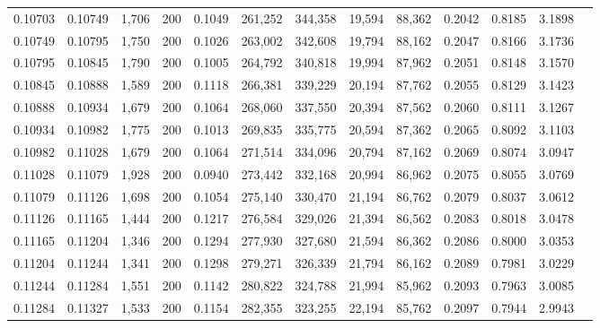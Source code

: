 \begin{tabular}{rrrrrrrrrrrrr}
0.10703 & 0.10749 & 1,706 & 200 &                                     0.1049 & 261,252 & 344,358 &  19,594 &  88,362 & 0.2042 & 0.8185 & 3.1898 \\
0.10749 & 0.10795 & 1,750 & 200 &                                     0.1026 & 263,002 & 342,608 &  19,794 &  88,162 & 0.2047 & 0.8166 & 3.1736 \\
0.10795 & 0.10845 & 1,790 & 200 &                                     0.1005 & 264,792 & 340,818 &  19,994 &  87,962 & 0.2051 & 0.8148 & 3.1570 \\
0.10845 & 0.10888 & 1,589 & 200 &                                     0.1118 & 266,381 & 339,229 &  20,194 &  87,762 & 0.2055 & 0.8129 & 3.1423 \\
0.10888 & 0.10934 & 1,679 & 200 &                                     0.1064 & 268,060 & 337,550 &  20,394 &  87,562 & 0.2060 & 0.8111 & 3.1267 \\
0.10934 & 0.10982 & 1,775 & 200 &                                     0.1013 & 269,835 & 335,775 &  20,594 &  87,362 & 0.2065 & 0.8092 & 3.1103 \\
0.10982 & 0.11028 & 1,679 & 200 &                                     0.1064 & 271,514 & 334,096 &  20,794 &  87,162 & 0.2069 & 0.8074 & 3.0947 \\
0.11028 & 0.11079 & 1,928 & 200 &                                     0.0940 & 273,442 & 332,168 &  20,994 &  86,962 & 0.2075 & 0.8055 & 3.0769 \\
0.11079 & 0.11126 & 1,698 & 200 &                                     0.1054 & 275,140 & 330,470 &  21,194 &  86,762 & 0.2079 & 0.8037 & 3.0612 \\
0.11126 & 0.11165 & 1,444 & 200 &                                     0.1217 & 276,584 & 329,026 &  21,394 &  86,562 & 0.2083 & 0.8018 & 3.0478 \\
0.11165 & 0.11204 & 1,346 & 200 &                                     0.1294 & 277,930 & 327,680 &  21,594 &  86,362 & 0.2086 & 0.8000 & 3.0353 \\
0.11204 & 0.11244 & 1,341 & 200 &                                     0.1298 & 279,271 & 326,339 &  21,794 &  86,162 & 0.2089 & 0.7981 & 3.0229 \\
0.11244 & 0.11284 & 1,551 & 200 &                                     0.1142 & 280,822 & 324,788 &  21,994 &  85,962 & 0.2093 & 0.7963 & 3.0085 \\
0.11284 & 0.11327 & 1,533 & 200 &                                     0.1154 & 282,355 & 323,255 &  22,194 &  85,762 & 0.2097 & 0.7944 & 2.9943 \\

\end{tabular}
